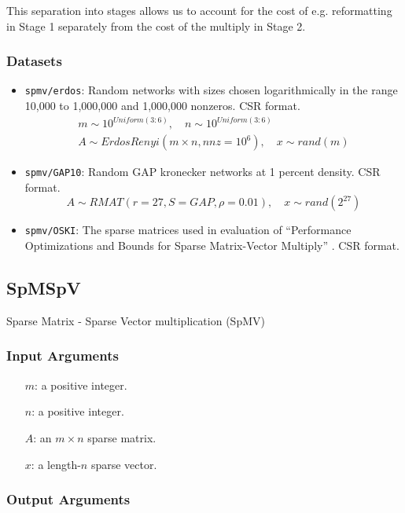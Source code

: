 \documentclass{article}
\begin{document}
This separation into stages allows us to account for the cost of e.g. reformatting in Stage 1 separately from the cost of the multiply in Stage 2.

\subsubsection{Datasets}

\begin{itemize}
	\item \texttt{spmv/erdos}: Random networks with sizes chosen logarithmically in the range 10,000 to 1,000,000 and 1,000,000 nonzeros. CSR format.
	\begin{multline*}
		m \sim 10^{Uniform(3:6)}, \quad n \sim 10^{Uniform(3:6)} \\
			A \sim ErdosRenyi\left(m\times n, nnz=10^6\right), \quad x \sim rand(m)
	\end{multline*}
	\item \texttt{spmv/GAP10}: Random GAP kronecker networks at 1 percent
	density. CSR format.
	\[
		A \sim RMAT\left(r=27, S = GAP, \rho = 0.01\right), \quad x \sim rand(2^{27})
	\]
	\item \texttt{spmv/OSKI}: The sparse matrices used in evaluation of
	``Performance Optimizations and Bounds for Sparse Matrix-Vector Multiply'' \cite{vuduc_performance_2002}. CSR format.
\end{itemize}

\subsection{SpMSpV}
Sparse Matrix - Sparse Vector multiplication (SpMV)
\subsubsection{Input Arguments}

\begin{itemize}
	\item[$m$:] a positive integer.
	\item[$n$:] a positive integer.
	\item[$A$:] an $m \times n$ sparse matrix.
	\item[$x$:] a length-$n$ sparse vector.
\end{itemize}

\subsubsection{Output Arguments}
\end{document}
